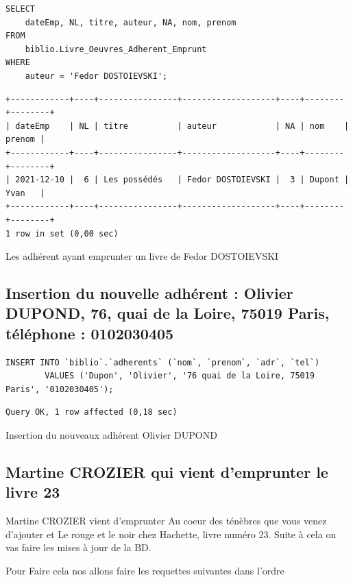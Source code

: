 \documentclass{article}
\begin{document}
\begin{listing}[H]
\begin{verbatim}
SELECT 
	dateEmp, NL, titre, auteur, NA, nom, prenom
FROM
	biblio.Livre_Oeuvres_Adherent_Emprunt
WHERE
	auteur = 'Fedor DOSTOIEVSKI';
\end{verbatim}
\begin{verbatim}
+------------+----+----------------+-------------------+----+--------+--------+
| dateEmp    | NL | titre          | auteur            | NA | nom    | prenom |
+------------+----+----------------+-------------------+----+--------+--------+
| 2021-12-10 |  6 | Les possédés   | Fedor DOSTOIEVSKI |  3 | Dupont | Yvan   |
+------------+----+----------------+-------------------+----+--------+--------+
1 row in set (0,00 sec)
\end{verbatim}
	\caption{Les adhérent ayant emprunter un livre de Fedor DOSTOIEVSKI}
\end{listing}

\subsection{ Insertion du nouvelle adhérent : Olivier DUPOND, 76, quai de la Loire,
	75019 Paris, téléphone : 0102030405}

\begin{listing}[H]
	\begin{verbatim}
INSERT INTO `biblio`.`adherents` (`nom`, `prenom`, `adr`, `tel`) 
		VALUES ('Dupon', 'Olivier', '76 quai de la Loire, 75019 Paris', '0102030405');
	\end{verbatim}
\begin{verbatim}
Query OK, 1 row affected (0,18 sec)
\end{verbatim}
	\caption{Insertion du nouveaux adhérent Olivier DUPOND}
\end{listing}

\subsection{Martine CROZIER qui vient d'emprunter le livre 23}

Martine CROZIER vient d’emprunter \og Au coeur des ténèbres\fg{} que vous venez
	d’ajouter et \og{}Le rouge et le noir\fg{} chez Hachette, livre numéro 23. 
Suite à cela on vas faire les mises à jour de la BD.

Pour Faire cela nos allons faire les requettes suivantes dans l'ordre
\end{document}
